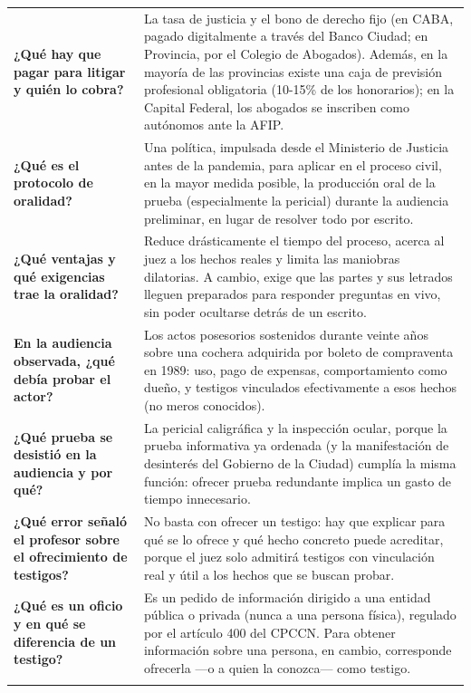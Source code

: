 \documentclass[12pt,oneside]{book}
\begin{document}
\begin{longtable}{
    >{\raggedright\arraybackslash}p{}
    >{\raggedright\arraybackslash}p{}
}
\textbf{¿Qué hay que pagar para litigar y quién lo cobra?} &
La tasa de justicia y el bono de derecho fijo (en CABA, pagado digitalmente a través del Banco Ciudad; en Provincia, por el Colegio de Abogados). Además, en la mayoría de las provincias existe una caja de previsión profesional obligatoria (10-15\% de los honorarios); en la Capital Federal, los abogados se inscriben como autónomos ante la AFIP. \\
\addlinespace

\textbf{¿Qué es el protocolo de oralidad?} &
Una política, impulsada desde el Ministerio de Justicia antes de la pandemia, para aplicar en el proceso civil, en la mayor medida posible, la producción oral de la prueba (especialmente la pericial) durante la audiencia preliminar, en lugar de resolver todo por escrito. \\
\addlinespace

\textbf{¿Qué ventajas y qué exigencias trae la oralidad?} &
Reduce drásticamente el tiempo del proceso, acerca al juez a los hechos reales y limita las maniobras dilatorias. A cambio, exige que las partes y sus letrados lleguen preparados para responder preguntas en vivo, sin poder ocultarse detrás de un escrito. \\
\addlinespace

\textbf{En la audiencia observada, ¿qué debía probar el actor?} &
Los actos posesorios sostenidos durante veinte años sobre una cochera adquirida por boleto de compraventa en 1989: uso, pago de expensas, comportamiento como dueño, y testigos vinculados efectivamente a esos hechos (no meros conocidos). \\
\addlinespace

\textbf{¿Qué prueba se desistió en la audiencia y por qué?} &
La pericial caligráfica y la inspección ocular, porque la prueba informativa ya ordenada (y la manifestación de desinterés del Gobierno de la Ciudad) cumplía la misma función: ofrecer prueba redundante implica un gasto de tiempo innecesario. \\
\addlinespace

\textbf{¿Qué error señaló el profesor sobre el ofrecimiento de testigos?} &
No basta con ofrecer un testigo: hay que explicar para qué se lo ofrece y qué hecho concreto puede acreditar, porque el juez solo admitirá testigos con vinculación real y útil a los hechos que se buscan probar. \\
\addlinespace

\textbf{¿Qué es un oficio y en qué se diferencia de un testigo?} &
Es un pedido de información dirigido a una entidad pública o privada (nunca a una persona física), regulado por el artículo 400 del CPCCN. Para obtener información sobre una persona, en cambio, corresponde ofrecerla —o a quien la conozca— como testigo. \\
\addlinespace


\end{longtable}
\end{document}
